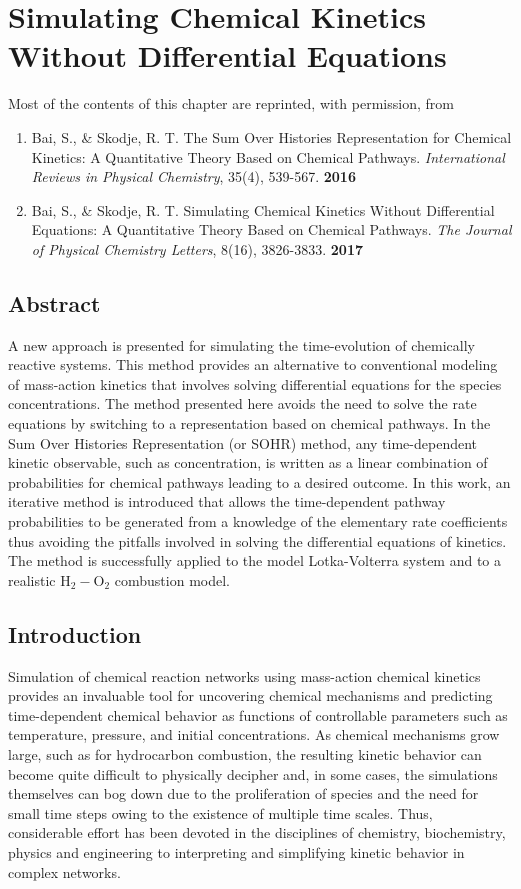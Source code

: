 \chapter{Simulating Chemical Kinetics Without Differential Equations}
\label{chapter4}
Most of the contents of this chapter are reprinted, with permission, from \
\begin{enumerate}
\item[\cite{ch4_10_bai2016sum}] Bai, S., \& Skodje, R. T. The Sum Over Histories Representation for Chemical Kinetics: A Quantitative Theory Based on Chemical Pathways. \textit{International Reviews in Physical Chemistry}, 35(4), 539-567. \textbf{2016}
\item[\cite{bai2017simulating}] Bai, S., \& Skodje, R. T. Simulating Chemical Kinetics Without Differential Equations: A Quantitative Theory Based on Chemical Pathways. \textit{The Journal of Physical Chemistry Letters}, 8(16), 3826-3833. \textbf{2017}
\end{enumerate}

\section{Abstract}
\label{ch4:sec:abstract}
A new approach is presented for simulating the time-evolution of chemically reactive systems.  This method provides an alternative to conventional modeling of mass-action kinetics that involves solving differential equations for the species concentrations.  The method presented here avoids the need to solve the rate equations by switching to a representation based on chemical pathways.  In the Sum Over Histories Representation (or SOHR) method, any time-dependent kinetic observable, such as concentration, is written as a linear combination of probabilities for chemical pathways leading to a desired outcome.  In this work, an iterative method is introduced that allows the time-dependent pathway probabilities to be generated from a knowledge of the elementary rate coefficients thus avoiding the pitfalls involved in solving the differential equations of kinetics.  The method is successfully applied to the model Lotka-Volterra system and to a realistic H$_2-$O$_2$ combustion model.

\section{Introduction}
\label{ch4:sec:intro}
Simulation of chemical reaction networks using mass-action chemical kinetics provides an invaluable tool for uncovering chemical mechanisms and predicting time-dependent chemical behavior as functions of controllable parameters such as temperature, pressure, and initial concentrations.  As chemical mechanisms grow large, such as for hydrocarbon combustion, the resulting kinetic behavior can become quite difficult to physically decipher and, in some cases, the simulations themselves can bog down due to the proliferation of species and the need for small time steps owing to the existence of multiple time scales.  Thus, considerable effort has been devoted in the disciplines of chemistry, biochemistry, physics and engineering to interpreting and simplifying kinetic behavior in complex networks.
\newline
